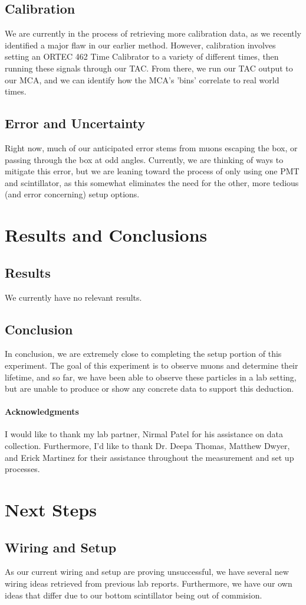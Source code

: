 \documentclass[10pt,letterpaper,onecolumn]{article}
\begin{document}
\subsection{Calibration}
We are currently in the process of retrieving more calibration data, as we recently identified a major flaw in our earlier method. However, calibration involves setting an ORTEC 462 Time Calibrator to a variety of different times, then running these signals through our TAC. From there, we run our TAC output to our MCA, and we can identify how the MCA's 'bins' correlate to real world times.
\subsection{Error and Uncertainty}
Right now, much of our anticipated error stems from muons escaping the box, or passing through the box at odd angles. Currently, we are thinking of ways to mitigate this error, but we are leaning toward the process of only using one PMT and scintillator, as this somewhat eliminates the need for the other, more tedious (and error concerning) setup options.
\section{Results and Conclusions}
\subsection{Results}
We currently have no relevant results.
\subsection{Conclusion}
In conclusion, we are extremely close to completing the setup portion of this experiment. The goal of this experiment is to observe muons and determine their lifetime, and so far, we have been able to observe these particles in a lab setting, but are unable to produce or show any concrete data to support this deduction.
\paragraph*{Acknowledgments}
I would like to thank my lab partner, Nirmal Patel for his assistance on data collection. Furthermore, I'd like to thank Dr. Deepa Thomas, Matthew Dwyer, and Erick Martinez for their assistance throughout the measurement and set up processes. 

\section{Next Steps}
\subsection{Wiring and Setup}
As our current wiring and setup are proving unsuccessful, we have several new wiring ideas retrieved from previous lab reports. Furthermore, we have our own ideas that differ due to our bottom scintillator being out of commision.
\newpage
 
\end{document}
